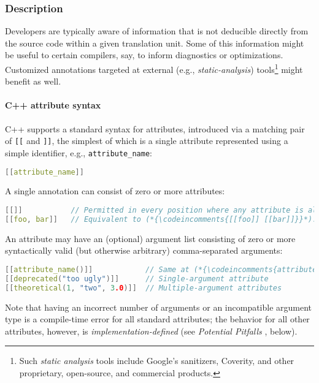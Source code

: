 \documentclass[twoside,10pt,letterpaper,usenames]{newstyle-PearsonGeneric-7-38}
\newcommand{\codeincomments}{\color{skyblue}\ttfamily}
\begin{document}
\subsubsection[Description]{Description}\label{description}

Developers are typically aware of information that is not deducible
directly from the source code within a given translation unit. Some of
this information might be useful to certain compilers, say, to inform
diagnostics or optimizations. Customized annotations targeted at
external (e.g., \emph{static-analysis}) tools{\cprotect\footnote{Such
\emph{static analysis} tools include Google's sanitizers, Coverity,
and other proprietary, open-source, and commercial products.}} might
benefit as well.

\paragraph[C++ attribute syntax]{C++ attribute syntax}\label{c++-attribute-syntax}

C++ supports a standard syntax for attributes, introduced via a matching
pair of \texttt{[[} and \texttt{]]}, the simplest of which is a single
attribute represented using a simple identifier, e.g.,
\texttt{attribute\_name}:

\begin{lstlisting}[language=C++]
[[attribute_name]]
\end{lstlisting}
    

A single annotation can consist of zero or more attributes:

\begin{lstlisting}[language=C++]
[[]]           // Permitted in every position where any attribute is allowed.
[[foo, bar]]   // Equivalent to (*{\codeincomments{[[foo]] [[bar]]}}*).
\end{lstlisting}
    

An attribute may have an (optional) argument list consisting of zero or
more syntactically valid (but otherwise arbitrary) comma-separated
arguments:

\begin{lstlisting}[language=C++]
[[attribute_name()]]            // Same at (*{\codeincomments{attribute\_name}}*)
[[deprecated("too ugly")]]      // Single-argument attribute
[[theoretical(1, "two", 3.0)]]  // Multiple-argument attributes
\end{lstlisting}
    

Note that having an incorrect number of arguments or an incompatible
argument type is a compile-time error for all standard attributes; the
behavior for all other attributes, however, is
\emph{implementation-defined} (see \emph{Potential Pitfalls} , below).
\end{document}
